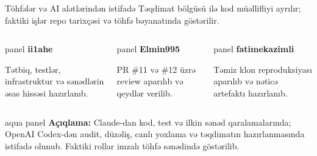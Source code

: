 \documentclass[aspectratio=169,11pt]{beamer}
\newenvironment{panel}{\begin{beamercolorbox}[wd=\linewidth,sep=1.2ex,rounded=true]{panel}}{\end{beamercolorbox}}
\newenvironment{aquapanel}{\begin{beamercolorbox}[wd=\linewidth,sep=1.2ex,rounded=true]{aqua panel}}{\end{beamercolorbox}}
\newcommand{\lead}[1]{{\color{muted}\normalsize #1}\par\vspace{0.75em}}
\newcommand{\speaker}{ii1ahe}
\begin{document}
\renewcommand{\speaker}{hər üç üzv}
\begin{frame}{Töhfələr və AI alətlərindən istifadə}
  \lead{Təqdimat bölgüsü ilə kod müəllifliyi ayrılır; faktiki işlər repo tarixçəsi və töhfə bəyanatında göstərilir.}
  \begin{columns}[T,onlytextwidth]
      \begin{panel}
        \textbf{ii1ahe}\par\vspace{1mm}
        \small Tətbiq, testlər, infrastruktur və sənədlərin əsas hissəsi hazırlanıb.
      \end{panel}
      \begin{panel}
        \textbf{Elmin995}\par\vspace{1mm}
        \small PR \#11 və \#12 üzrə review aparılıb və qeydlər verilib.
      \end{panel}
      \begin{panel}
        \textbf{fatimekazimli}\par\vspace{1mm}
        \small Təmiz klon reproduksiyası aparılıb və nəticə artefaktı hazırlanıb.
      \end{panel}
  \end{columns}
  \vspace{5mm}
  \begin{aquapanel}
    \small \textbf{Açıqlama:} Claude-dan kod, test və ilkin sənəd qaralamalarında; OpenAI Codex-dən audit, düzəliş, canlı yoxlama və təqdimatın hazırlanmasında istifadə olunub. Faktiki rollar imzalı töhfə sənədində göstərilib.
  \end{aquapanel}
\end{frame}
\end{document}
